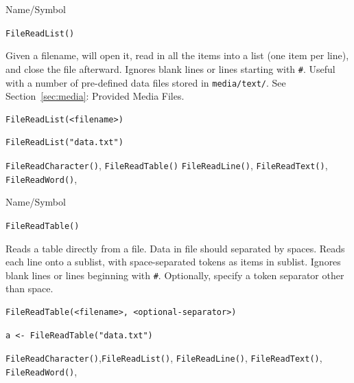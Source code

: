 \begin{desc}{Name/Symbol}
\item[Name/Symbol]  	\verb+FileReadList()+
 
\item[Description] Given a filename, will open it, read in all the
  items into a list (one item per line), and close the file afterward.
  Ignores blank lines or lines starting with \verb+#+.  Useful with a
  number of pre-defined data files stored in \verb+media/text/+.  See
  Section~\ref{sec:media}: Provided Media Files.

\item[Usage]
\begin{verbatim}
FileReadList(<filename>)
\end{verbatim}

\item[Example]
\begin{verbatim}
FileReadList("data.txt")
\end{verbatim}

\item[See Also]

	\verb+FileReadCharacter()+, \verb+FileReadTable()+
	\verb+FileReadLine()+, 	\verb+FileReadText()+, 	\verb+FileReadWord()+,

\end{desc}

\begin{desc}{Name/Symbol}
\item[Name/Symbol]	\verb+FileReadTable()+

\item[Description]	Reads a table directly from a file. Data in file should
		separated by spaces.  Reads each line onto a sublist,
		with space-separated tokens as items in sublist.  Ignores
		blank lines or lines beginning with \verb+#+. Optionally,
		specify a token separator other than space.

\item[Usage]
\begin{verbatim}
FileReadTable(<filename>, <optional-separator>)
\end{verbatim}

\item[Example]
\begin{verbatim}
a <- FileReadTable("data.txt")
\end{verbatim}

\item[See Also]	
	\verb+FileReadCharacter()+,\verb+FileReadList()+, 
	\verb+FileReadLine()+, 	\verb+FileReadText()+, 	\verb+FileReadWord()+,

\end{desc}



